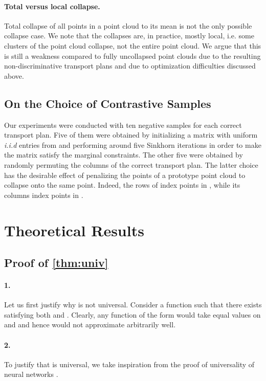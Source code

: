 \documentclass[letterpaper]{article} \usepackage{aaai22}  \usepackage{times}  \usepackage{helvet}  \usepackage{courier}  \usepackage[hyphens]{url}  \usepackage{graphicx} \urlstyle{rm} \def\UrlFont{\rm}  \usepackage{natbib}  \usepackage{caption} \DeclareCaptionStyle{ruled}{labelfont=normalfont,labelsep=colon,strut=off} \frenchspacing  \setlength{\pdfpagewidth}{8.5in}  \setlength{\pdfpageheight}{11in}  \usepackage{algorithm}
\begin{document}
\paragraph{Total versus local collapse.} Total collapse of all points in a point cloud to its mean is not the only possible collapse case. We note that the collapses are, in practice, mostly local, i.e. some clusters of the point cloud collapse, not the entire point cloud. We argue that this is still a weakness compared to fully uncollapsed point clouds due to the resulting non-discriminative transport plans and due to optimization difficulties discussed above.

\subsection{On the Choice of Contrastive Samples}\label{sec:contrastive-samples}

Our experiments were conducted with ten negative samples for each correct transport plan. Five of them were obtained by initializing a matrix with uniform \textit{i.i.d} entries from  and performing around five Sinkhorn iterations \citep{cuturi2013sinkhorn} in order to make the matrix satisfy the marginal constraints. The other five were obtained by randomly permuting the columns of the correct transport plan. The latter choice has the desirable effect of penalizing the points of a prototype point cloud  to collapse onto the same point. Indeed, the rows of  index points in , while its columns index points in . 

\section{Theoretical Results}

\subsection{Proof of \cref{thm:univ}}\label{sec:proof-univ}

\paragraph{1.} Let us first justify why  is not universal. Consider a function  such that there exists  satisfying both  and . Clearly, any function of the form  would take equal values on  and  and hence would not approximate  arbitrarily well.

\paragraph{2.} To justify that  is universal, we take inspiration from the proof of universality of neural networks \cite{cybenko1989approximation}.
\end{document}
